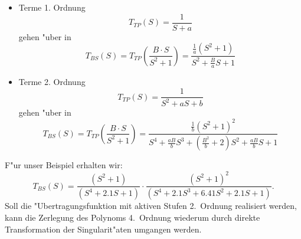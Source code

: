 \begin{itemize}
\item Terme 1. Ordnung
\begin{equation}
        T_{TP}(S)=\frac{1}{S+a}
\end{equation}
\nit gehen "uber in
\begin{equation}
        T_{BS}(S)=T_{TP}\left(\frac{B\cdot S}{S^{2}+1}\right)=
        \frac{\frac{1}{a}(S^{2}+1)}{S^{2}+\frac{B}{a}S+1}
\end{equation}
\item Terme 2. Ordnung
\begin{equation}
        T_{TP}(S)=\frac{1}{S^{2}+aS+b}
\end{equation}
\nit gehen "uber in
\begin{equation}
        T_{BS}(S)=T_{TP}\left(\frac{B\cdot S}{S^{2}+1}\right)=
                    \frac{\frac{1}{b}(S^{2}+1)^{2}}{S^{4}+
                    \displaystyle\frac{aB}{b}S^{3}+
                   \left(\displaystyle\frac{B^{2}}{b}+2\right)S^{2}+
                    \displaystyle\frac{aB}{b}S+1}
\end{equation}
\end{itemize}
 F"ur unser Beispiel erhalten wir:
\[
T_{BS}(S)=\frac{(S^{2}+1)}{(S^{4}+2.1S+1)}\cdot
\frac{(S^{2}+1)^{2}}{(S^{4}+2.1S^{3}+6.41S^{2}+2.1S+1)}.
\]
\nit Soll die "Ubertragungsfunktion mit aktiven Stufen 2.~Ordnung realisiert
werden, kann die Zerlegung des Polynoms 4.~Ordnung wiederum durch direkte
Transformation der Singularit"aten umgangen werden.
